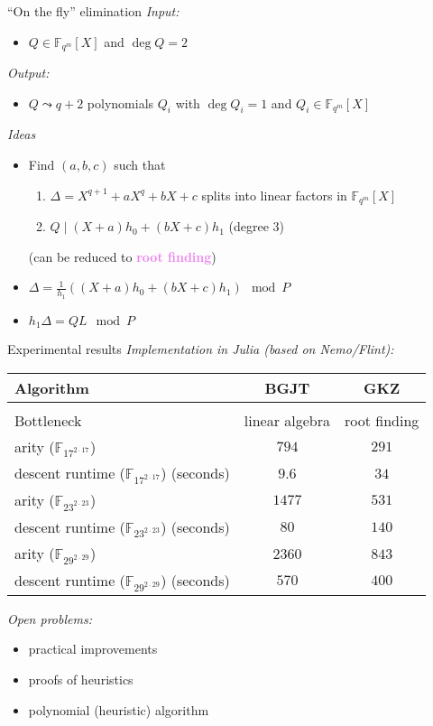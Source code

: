\documentclass[xcolor=x11names,compress]{beamer}
\theoremstyle{break}
\theoremstyle{sc}
\theoremstyle{definition}
\theoremstyle{remark}
\begin{document}
\begin{frame}{``On the fly'' elimination}
  \emph{Input:}
  \begin{itemize}
    \item $Q\in \mathbb{F}_{q^m}[X]$ and $\deg Q = 2$
  \end{itemize}
  \emph{Output:}
  \begin{itemize}
    \item $Q\leadsto q+2$ polynomials $Q_i$ with $\deg Q_i = 1$ and $Q_i\in
      \mathbb{F}_{q^m}[X]$
  \end{itemize}

  \emph{Ideas}
  \begin{itemize}
    \item Find $(a, b, c)$ such that
      \begin{enumerate}
        \item $\Delta = X^{q+1}+aX^q+bX+c$ splits into linear factors in $\mathbb{F}_{q^m}[X]$
        \item $Q\;|\; (X+a)h_0 + (bX+c)h_1$ (degree $3$)
      \end{enumerate}
      (can be reduced to \textcolor{violet}{\textbf{root finding}})
    \item $ \Delta = \frac{1}{h_1}((X+a)h_0 + (bX+c)h_1)\mod P $
    \item $ h_1\Delta=QL \mod P$
      
  \end{itemize}
\end{frame}

\begin{frame}{Experimental results}
  \emph{Implementation in Julia (based on Nemo/Flint):}
\begin{center}
  \begin{tabular}[here]{lcc}
  Algorithm  & BGJT & GKZ \\
    \hline
    & & \\
    Bottleneck & linear algebra & root finding \\
    arity ($\mathbb{F}_{17^{2\cdot17}}$) & $794$ & $291$ \\
    descent runtime ($\mathbb{F}_{17^{2\cdot17}}$) (seconds) & $9.6$ & $34$ \\
    arity ($\mathbb{F}_{23^{2\cdot23}}$) & $1477$ & $531$ \\
    descent runtime ($\mathbb{F}_{23^{2\cdot23}}$) (seconds) & $80$ & $140$ \\
    arity ($\mathbb{F}_{29^{2\cdot29}}$) & $2360$ & $843$ \\
    descent runtime ($\mathbb{F}_{29^{2\cdot29}}$) (seconds) & $570$ & $400$ \\
  \end{tabular}
\end{center}

  \emph{Open problems:}
  \begin{itemize}
    \item practical improvements
    \item proofs of heuristics
    \item polynomial (heuristic) algorithm
  \end{itemize}

\end{frame}

\end{document}
